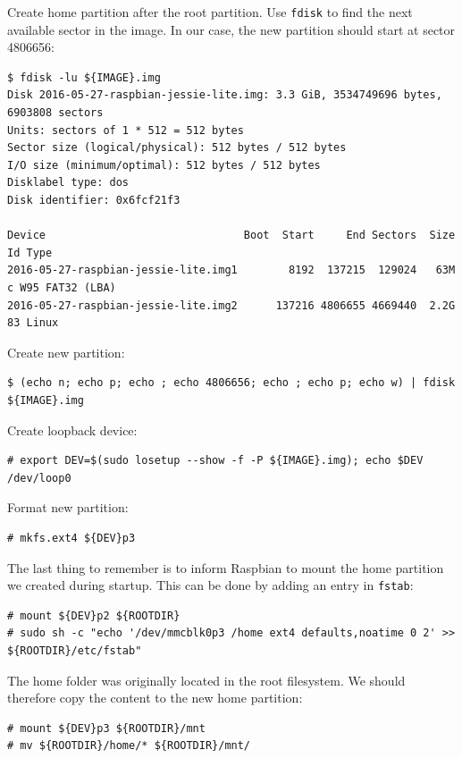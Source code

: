 Create home partition after the root partition. Use \texttt{fdisk} to
find the next available sector in the image. In our case, the new
partition should start at sector 4806656:
\begin{lstlisting}[]
$ fdisk -lu ${IMAGE}.img
Disk 2016-05-27-raspbian-jessie-lite.img: 3.3 GiB, 3534749696 bytes, 6903808 sectors
Units: sectors of 1 * 512 = 512 bytes
Sector size (logical/physical): 512 bytes / 512 bytes
I/O size (minimum/optimal): 512 bytes / 512 bytes
Disklabel type: dos
Disk identifier: 0x6fcf21f3

Device                               Boot  Start     End Sectors  Size Id Type
2016-05-27-raspbian-jessie-lite.img1        8192  137215  129024   63M  c W95 FAT32 (LBA)
2016-05-27-raspbian-jessie-lite.img2      137216 4806655 4669440  2.2G 83 Linux
\end{lstlisting}
\FloatBarrier
\vspace{-5mm}

Create new partition:

\begin{lstlisting}[]
$ (echo n; echo p; echo ; echo 4806656; echo ; echo p; echo w) | fdisk ${IMAGE}.img
\end{lstlisting}
\FloatBarrier
\vspace{-5mm}

Create loopback device: 
\begin{lstlisting}[]
# export DEV=$(sudo losetup --show -f -P ${IMAGE}.img); echo $DEV
/dev/loop0
\end{lstlisting}
\FloatBarrier
\vspace{-5mm}

Format new partition:
\begin{lstlisting}[]
# mkfs.ext4 ${DEV}p3
\end{lstlisting}
\FloatBarrier
\vspace{-5mm}

The last thing to remember is to inform Raspbian to mount the home partition
we created during startup. This can be done by adding an entry in \texttt{fstab}:
\begin{lstlisting}[]
# mount ${DEV}p2 ${ROOTDIR}
# sudo sh -c "echo '/dev/mmcblk0p3 /home ext4 defaults,noatime 0 2' >> ${ROOTDIR}/etc/fstab"
\end{lstlisting}
\FloatBarrier
\vspace{-5mm}

The home folder was originally located in the root filesystem. We should
therefore copy the content to the new home partition:
\begin{lstlisting}[]
# mount ${DEV}p3 ${ROOTDIR}/mnt
# mv ${ROOTDIR}/home/* ${ROOTDIR}/mnt/
\end{lstlisting}
\FloatBarrier
\vspace{-5mm}

